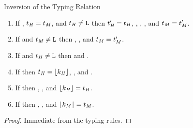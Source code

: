 \begin{lemma}{Inversion of the Typing Relation}
\begin{enumerate}

\item If \judeh{\env}{\exphm{\first{\vartyh}}{\first{\vartym}}{\varexpm}}{\second{\vartyh}}, $t_{\mathit{H}} = t_{\mathit{M}}$, and $t_{\mathit{H}} \neq \mathtt{L}$ then $t_{\mathit{H}}' = t_{\mathit{H}}$, \judth{\env}{\first{\vartyh}}, \judtm{\env}{\first{\vartym}}, \judem{\env}{\varexpm}{\second{\vartym}}, and $t_{\mathit{M}} = t_{\mathit{M}}'$.


\item If \judeh{\env}{\exphm{\tylump}{\first{\vartym}}{\varexpm}}{\tylump} and $t_{\mathit{M}} \neq \mathtt{L}$ then \judtm{\env}{\first{\vartym}}, \judem{\env}{\varexpm}{\second{\vartym}}, and $t_{\mathit{M}} = t_{\mathit{M}}'$.


\item If \judeh{\env}{\exphm{\first{\vartyh}}{\tylump}{\varexpm}}{\second{\vartyh}} and $t_{\mathit{H}} \neq \mathtt{L}$ then \judth{\env}{\vartyh} and \judem{\env}{\varexpm}{\tylump}.


\item If \judeh{\env}{\exphs{\varcsh}{\varexps}}{\vartyh} then $t_{\mathit{H}} = \lfloor k_{\mathit{H}} \rfloor$, \judth{\env}{\tyunbrand{\varcsh}}, and \judes{\env}{\varexps}{\tytst}.



\item If \judes{\env}{\expsh{\varcsh}{\varexph}}{\tytst} then \judth{\env}{\tyunbrand{\varcsh}}, \judeh{\env}{\varexph}{\vartyh}, and $\lfloor k_{\mathit{H}} \rfloor = t_{\mathit{H}}$.


\item If \judes{\env}{\expsm{\varcsm}{\varexpm}}{\tytst} then \judtm{\env}{\tyunbrand{\varcsm}}, \judem{\env}{\varexpm}{\vartym}, and $\lfloor k_{\mathit{M}} \rfloor = t_{\mathit{M}}$.

\end{enumerate}

\begin{proof}

Immediate from the typing rules.

\end{proof}

\end{lemma}
